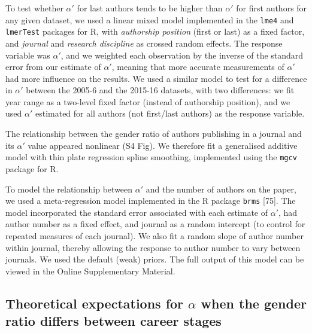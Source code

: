\documentclass[12pt,]{article}
\begin{document}
To test whether \(\alpha'\) for last authors tends to be higher than
\(\alpha'\) for first authors for any given dataset, we used a linear
mixed model implemented in the \texttt{lme4} and \texttt{lmerTest}
packages for R, with \emph{authorship position} (first or last) as a
fixed factor, and \emph{journal} and \emph{research discipline} as
crossed random effects. The response variable was \(\alpha'\), and we
weighted each observation by the inverse of the standard error from our
estimate of \(\alpha'\), meaning that more accurate measurements of
\(\alpha'\) had more influence on the results. We used a similar model
to test for a difference in \(\alpha'\) between the 2005-6 and the
2015-16 datasets, with two differences: we fit year range as a two-level
fixed factor (instead of authorship position), and we used \(\alpha'\)
estimated for all authors (not first/last authors) as the response
variable.

The relationship between the gender ratio of authors publishing in a
journal and its \(\alpha'\) value appeared nonlinear (S4 Fig). We
therefore fit a generalised additive model with thin plate regression
spline smoothing, implemented using the \texttt{mgcv} package for R.

To model the relationship between \(\alpha'\) and the number of authors
on the paper, we used a meta-regression model implemented in the R
package \texttt{brms} {[}75{]}. The model incorporated the standard
error associated with each estimate of \(\alpha'\), had author number as
a fixed effect, and journal as a random intercept (to control for
repeated measures of each journal). We also fit a random slope of author
number within journal, thereby allowing the response to author number to
vary between journals. We used the default (weak) priors. The full
output of this model can be viewed in the Online Supplementary Material.

\hypertarget{theoretical-expectations-for-alpha-when-the-gender-ratio-differs-between-career-stages-1}{%
\subsection{\texorpdfstring{Theoretical expectations for \(\alpha\) when
the gender ratio differs between career
stages}{Theoretical expectations for \textbackslash{}alpha when the gender ratio differs between career stages}}\label{theoretical-expectations-for-alpha-when-the-gender-ratio-differs-between-career-stages-1}}
\end{document}

